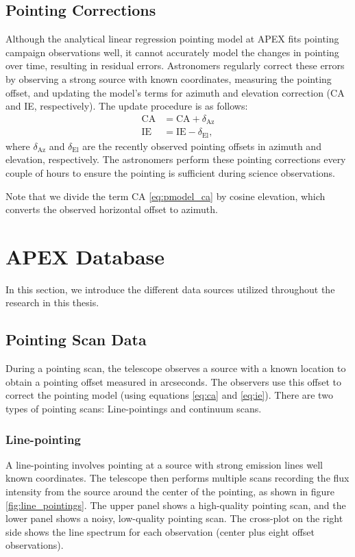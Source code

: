 \subsection{Pointing Corrections} 
Although the analytical linear regression pointing model at APEX fits pointing campaign observations well,
it cannot accurately model the changes in pointing over time, resulting in residual errors.
Astronomers regularly correct these errors by observing a strong source with known coordinates,
measuring the pointing offset, and updating the model's terms for azimuth and elevation correction (CA and IE, respectively).
The update procedure is as follows:
\begin{align}
    \text{CA} &= \text{CA} + \delta_{\text{Az}} \label{eq:ca}\\ 
    \text{IE} &= \text{IE} - \delta_{\text{El}},\label{eq:ie}
\end{align}
where $\delta_{\text{Az}}$ and $\delta_{\text{El}}$ are the recently observed pointing offsets in azimuth and elevation, respectively.
The astronomers perform these pointing corrections every couple of hours to ensure the pointing is sufficient during science observations.

Note that we divide the term CA \eqref{eq:pmodel_ca} by cosine elevation, which converts the observed horizontal offset to azimuth.

\section{APEX Database} \label{sec:database}
In this section, we introduce the different data sources utilized throughout the research in this thesis.


\subsection{Pointing Scan Data}
During a pointing scan, the telescope observes a source with a known location to obtain a pointing offset measured in arcseconds.
The observers use this offset to correct the pointing model (using equations \eqref{eq:ca} and \eqref{eq:ie}).
There are two types of pointing scans: Line-pointings and continuum scans.

\subsubsection{Line-pointing}
A line-pointing involves pointing at a source with strong emission lines well known coordinates. 
The telescope then performs multiple scans recording the flux intensity from the source around the center of the pointing, as shown in figure \ref{fig:line_pointings}.
The upper panel shows a high-quality pointing scan, and the lower panel shows a noisy, low-quality pointing scan.
The cross-plot on the right side shows the line spectrum for each observation (center plus eight offset observations).

